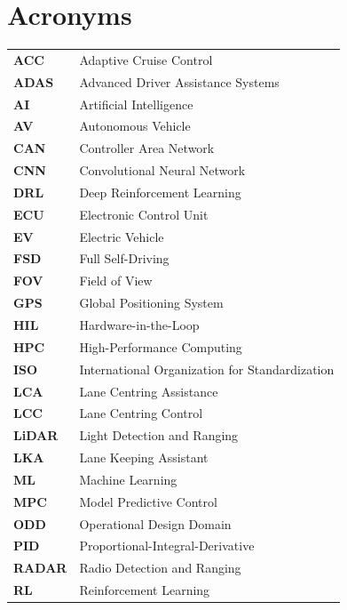 \documentclass[12pt, a4paper]{report}
\begin{document}
\listoffigures
\newpage

\listoftables
\newpage

\chapter*{Acronyms}

\begin{longtable}{@{}ll@{}}
    \textbf{ACC} & Adaptive Cruise Control \\
    \textbf{ADAS} & Advanced Driver Assistance Systems \\
    \textbf{AI} & Artificial Intelligence \\
    \textbf{AV} & Autonomous Vehicle \\
    \textbf{CAN} & Controller Area Network \\
    \textbf{CNN} & Convolutional Neural Network \\
    \textbf{DRL} & Deep Reinforcement Learning \\
    \textbf{ECU} & Electronic Control Unit \\
    \textbf{EV} & Electric Vehicle \\
    \textbf{FSD} & Full Self-Driving \\
    \textbf{FOV} & Field of View \\
    \textbf{GPS} & Global Positioning System \\
    \textbf{HIL} & Hardware-in-the-Loop \\
    \textbf{HPC} & High-Performance Computing \\
    \textbf{ISO} & International Organization for Standardization \\
    \textbf{LCA} & Lane Centring Assistance \\
    \textbf{LCC} & Lane Centring Control \\
    \textbf{LiDAR} & Light Detection and Ranging \\
    \textbf{LKA} & Lane Keeping Assistant \\
    \textbf{ML} & Machine Learning \\
    \textbf{MPC} & Model Predictive Control \\
    \textbf{ODD} & Operational Design Domain \\
    \textbf{PID} & Proportional-Integral-Derivative \\
    \textbf{RADAR} & Radio Detection and Ranging \\
    \textbf{RL} & Reinforcement Learning \\

\end{longtable}
\end{document}
